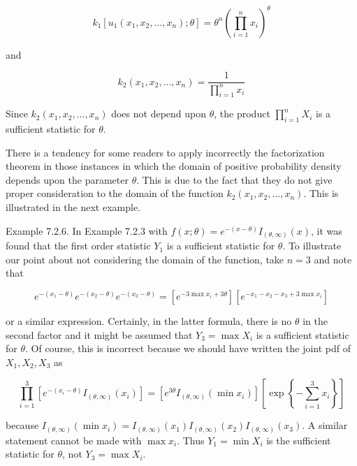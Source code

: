 $$
k_{1}\left[u_{1}\left(x_{1}, x_{2}, \ldots, x_{n}\right) ; \theta\right]=\theta^{n}\left(\prod_{i=1}^{n} x_{i}\right)^{\theta}
$$

and

$$
k_{2}\left(x_{1}, x_{2}, \ldots, x_{n}\right)=\frac{1}{\prod_{i=1}^{n} x_{i}}
$$

Since $k_{2}\left(x_{1}, x_{2}, \ldots, x_{n}\right)$ does not depend upon $\theta$, the product $\prod_{i=1}^{n} X_{i}$ is a sufficient statistic for $\theta$.

There is a tendency for some readers to apply incorrectly the factorization theorem in those instances in which the domain of positive probability density depends upon the parameter $\theta$. This is due to the fact that they do not give proper consideration to the domain of the function $k_{2}\left(x_{1}, x_{2}, \ldots, x_{n}\right)$. This is illustrated in the next example.

Example 7.2.6. In Example 7.2.3 with $f(x ; \theta)=e^{-(x-\theta)} I_{(\theta, \infty)}(x)$, it was found that the first order statistic $Y_{1}$ is a sufficient statistic for $\theta$. To illustrate our point about not considering the domain of the function, take $n=3$ and note that

$$
e^{-\left(x_{1}-\theta\right)} e^{-\left(x_{2}-\theta\right)} e^{-\left(x_{3}-\theta\right)}=\left[e^{-3 \max x_{i}+3 \theta}\right]\left[e^{-x_{1}-x_{2}-x_{3}+3 \max x_{i}}\right]
$$

or a similar expression. Certainly, in the latter formula, there is no $\theta$ in the second factor and it might be assumed that $Y_{3}=\max X_{i}$ is a sufficient statistic for $\theta$. Of course, this is incorrect because we should have written the joint pdf of $X_{1}, X_{2}, X_{3}$ as

$$
\prod_{i=1}^{3}\left[e^{-\left(x_{i}-\theta\right)} I_{(\theta, \infty)}\left(x_{i}\right)\right]=\left[e^{3 \theta} I_{(\theta, \infty)}\left(\min x_{i}\right)\right]\left[\exp \left\{-\sum_{i=1}^{3} x_{i}\right\}\right]
$$

because $I_{(\theta, \infty)}\left(\min x_{i}\right)=I_{(\theta, \infty)}\left(x_{1}\right) I_{(\theta, \infty)}\left(x_{2}\right) I_{(\theta, \infty)}\left(x_{3}\right)$. A similar statement cannot be made with $\max x_{i}$. Thus $Y_{1}=\min X_{i}$ is the sufficient statistic for $\theta$, not $Y_{3}=\max X_{i}$.

